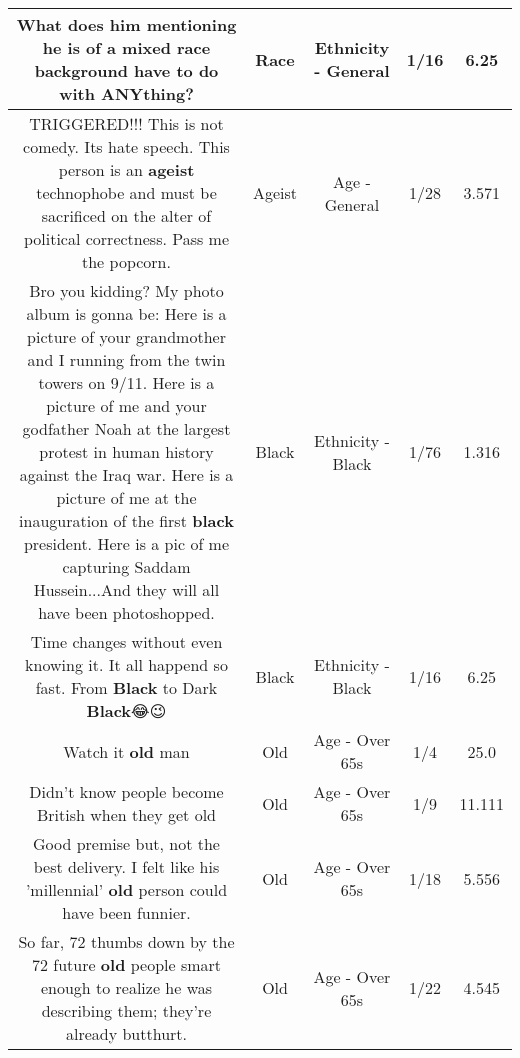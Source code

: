 \documentclass[11pt]{article}
\newlength\mylength
\begin{document}
\begin{center}
\begin{longtable}{|C{.65\mylength}|C{.30\mylength}|C{.12\mylength}|C{.12\mylength}|C{.12\mylength}|}
  \small What does him mentioning he is of a mixed \textbf{race} background have to do with ANYthing?\normalsize   & Race & Ethnicity - General & 1/16 & 6.25 \\  \hline
  \small TRIGGERED!!! This is not comedy. Its hate speech. This person is an \textbf{ageist} technophobe and must be sacrificed on the alter of political correctness. Pass me the popcorn.\normalsize   & Ageist & Age - General & 1/28 & 3.571 \\  \hline
  \small Bro you kidding? My photo album is gonna be: Here is a picture of your grandmother and I running from the twin towers on 9/11. Here is a picture of me and your godfather Noah at the largest protest in human history against the Iraq war.  Here is a picture of me at the inauguration of the first \textbf{black} president. Here is a pic of me capturing Saddam Hussein...And they will all have been photoshopped.\normalsize   & Black & Ethnicity - Black & 1/76 & 1.316 \\  \hline
  \small Time changes without even knowing it. It all happend so fast. From \textbf{Black} to Dark \textbf{Black}😂😉\normalsize   & Black & Ethnicity - Black & 1/16 & 6.25 \\  \hline
  \small Watch it \textbf{old} man\normalsize   & Old & Age - Over 65s & 1/4 & 25.0 \\  \hline
  \small Didn't know  people become British when they get old\normalsize   & Old & Age - Over 65s & 1/9 & 11.111 \\  \hline
  \small Good premise but, not the best delivery.  I felt like his 'millennial' \textbf{old} person could have been funnier.\normalsize   & Old & Age - Over 65s & 1/18 & 5.556 \\  \hline
  \small So far, 72 thumbs down by the 72 future \textbf{old} people smart enough to realize he was describing them; they're already butthurt.\normalsize   & Old & Age - Over 65s & 1/22 & 4.545 \\  \hline

\end{longtable}
\end{center}
\end{document}
